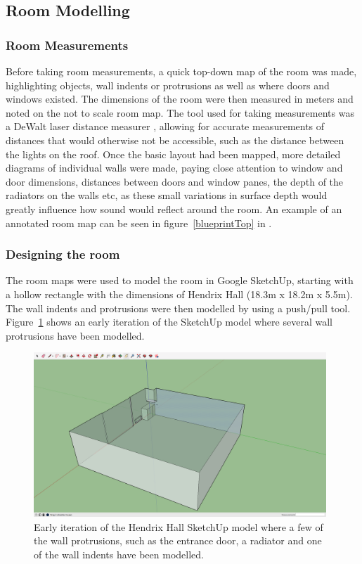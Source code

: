 \documentclass[../../main.tex]{subfiles}
\begin{document}
	\subsection{Room Modelling}

		\subsubsection{Room Measurements}

			Before taking room measurements, a quick top-down map of the room was made, highlighting objects, wall indents or protrusions as well as where doors and windows existed. The dimensions of the room were then measured in meters and noted on the not to scale room map. The tool used for taking measurements was a DeWalt laser distance measurer \cite{dewalt}, allowing for accurate measurements of distances that would otherwise not be accessible, such as the distance between the lights on the roof. Once the basic layout had been mapped, more detailed diagrams of individual walls were made, paying close attention to window and door dimensions, distances between doors and window panes, the depth of the radiators on the walls etc, as these small variations in surface depth would greatly influence how sound would reflect around the room. An example of an annotated room map can be seen in figure~\ref{blueprintTop} in .

		\subsubsection{Designing the room}
			\label{designRoom}
			The room maps were used to model the room in Google SketchUp, starting with a hollow rectangle with the dimensions of Hendrix Hall (18.3m x 18.2m x 5.5m). The wall indents and protrusions were then modelled by using a push/pull tool. Figure~\ref{sku1} shows an early iteration of the SketchUp model where several wall protrusions have been modelled.

			\begin{figure}
				\center\includegraphics[width=0.98\textwidth]{Sections/Implementation/Modelling/images/sku1.png}
				\caption{Early iteration of the Hendrix Hall SketchUp model where a few of the wall protrusions, such as the entrance door, a radiator and one of the wall indents have been modelled.}
				\label{sku1}
			\end{figure}
\end{document}
